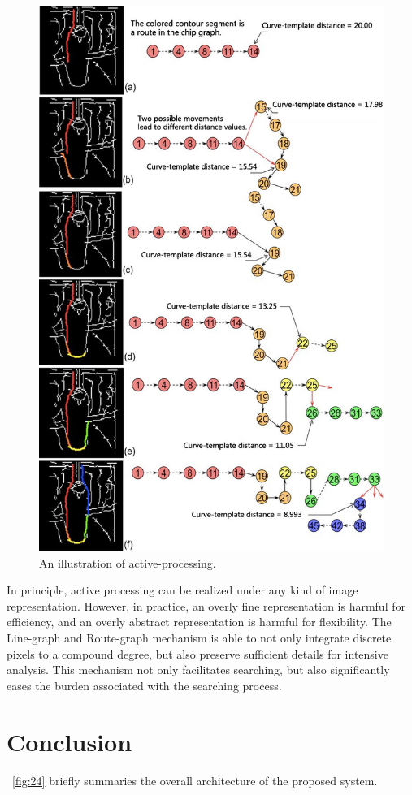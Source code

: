 \documentclass[journal]{IEEEtran}
\begin{document}
\begin{figure}[!t]
\centering
\includegraphics[width=0.8\linewidth]{images/fig23.jpg}
\caption{An illustration of active-processing.}
\label{fig:23}
\end{figure}

In principle, active processing can be realized under any kind of image representation. 
However, in practice, an overly fine representation is harmful for efficiency, 
and an overly abstract representation is harmful for flexibility. 
The Line-graph and Route-graph mechanism is able to not only integrate discrete pixels to a compound degree, 
but also preserve sufficient details for intensive analysis. 
This mechanism not only facilitates searching, 
but also significantly eases the burden associated with the searching process.

\section{Conclusion}

\figurename~\ref{fig:24} briefly summaries the overall architecture of the proposed system.
\end{document}
